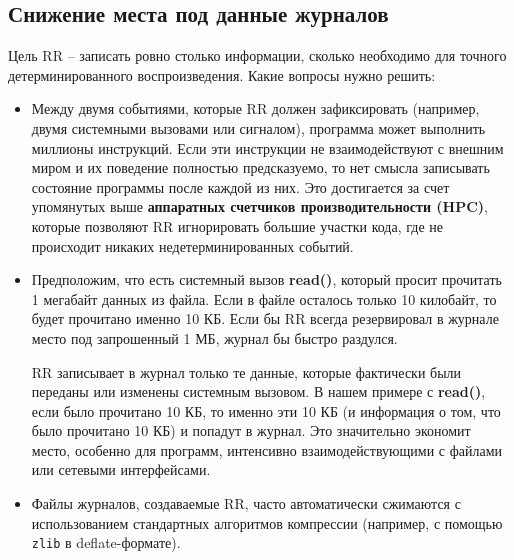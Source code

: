 \subsection{Снижение места под данные журналов}



Цель RR – записать ровно столько информации, сколько необходимо для точного
детерминированного воспроизведения. Какие вопросы нужно решить:

\begin{itemize}

  \item Между двумя событиями, которые RR должен зафиксировать (например, двумя
  системными вызовами или сигналом), программа может выполнить миллионы
  инструкций. Если эти инструкции не взаимодействуют с внешним миром и их
  поведение полностью предсказуемо, то нет смысла записывать состояние
  программы после каждой из них. Это достигается за счет упомянутых выше
  \textbf{аппаратных счетчиков производительности (HPC)}, которые позволяют RR
  игнорировать большие участки кода, где не происходит никаких
  недетерминированных событий.

  \item Предположим, что есть системный вызов \textbf{read()}, который просит прочитать 1 мегабайт
  данных из файла. Если в файле осталось только 10 килобайт, то будет прочитано
  именно 10 КБ. Если бы RR всегда резервировал в журнале место под запрошенный 1
  МБ, журнал бы быстро раздулся. 

  RR записывает в журнал только те данные, которые фактически были переданы или
  изменены системным вызовом. В нашем примере с \textbf{read()}, если было
  прочитано 10 КБ, то именно эти 10 КБ (и информация о том, что было прочитано
  10 КБ) и попадут в журнал. Это значительно экономит место, особенно для
  программ, интенсивно взаимодействующими с файлами или сетевыми интерфейсами.

  \item Файлы журналов, создаваемые RR, часто автоматически сжимаются с
  использованием стандартных алгоритмов компрессии (например, с помощью
  \texttt{zlib} в deflate-формате).

\end{itemize}

